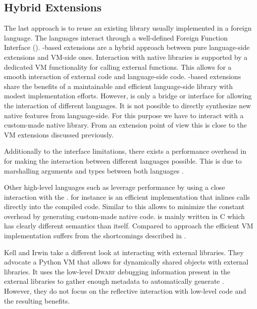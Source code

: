 \subsection{Hybrid Extensions}
The last approach is to reuse an existing library usually implemented in a foreign language.
The languages interact through a well-defined Foreign Function Interface (\FFI).
\FFI-based extensions are a hybrid approach between pure language-side extensions and VM-side ones.
Interaction with native libraries is supported by a dedicated VM functionality for calling external functions.
This allows for a smooth interaction of external code and language-side code.
\FFI-based extensions share the benefits of a maintainable and efficient language-side library with modest implementation efforts.
However, \FFI is only a bridge or interface for allowing the interaction of different languages. 
It is not possible to directly synthesize new native features from language-side.
For this purpose we have to interact with a custom-made native library.
From an extension point of view this is close to the VM extensions discussed previously.

Additionally to the interface limitations, there exists a performance overhead in \FFI for making the interaction between different languages possible. 
This is due to marshalling arguments and types between both languages \cite{Fish00a,Repp06b}.


Other high-level languages such as \Lua leverage \FFI performance by using a close interaction with the \JIT.
\Luajit \cite{luaffi} for instance is an efficient \Lua implementation that inlines \FFI calls directly into the \JIT compiled code.
Similar to \B this allows to minimize the constant overhead by generating custom-made native code.
\Luajit is mainly written in C which has clearly different semantics than \Lua itself.
Compared to  approach the efficient VM implementation suffers from the shortcomings described in . 

Kell and Irwin \cite{Kell11a} take a different look at interacting with external libraries.
They advocate a Python VM that allows for dynamically shared objects with external libraries.
It uses the low-level \textsc{Dwarf} debugging information present in the external libraries to gather enough metadata to automatically generate \FFI{}.
However, they do not focus on the reflective interaction with low-level code and the resulting benefits. 

